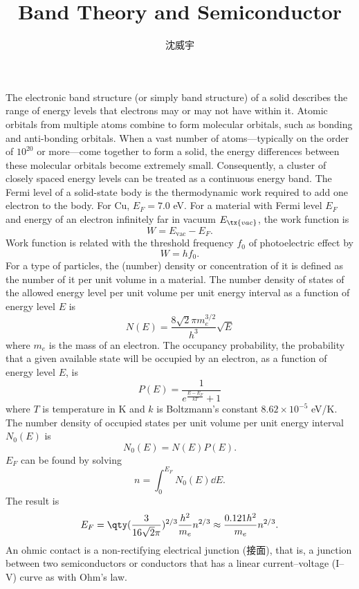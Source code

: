 \documentclass[a4paper,12pt]{article}
\begin{document}
\title{Band Theory and Semiconductor}
\author{沈威宇}
\date{\temtoday}
\titletocdoc
{}
The electronic band structure (or simply band structure) of a solid describes the range of energy levels that electrons may or may not have within it.
Atomic orbitals from multiple atoms combine to form molecular orbitals, such as bonding and anti-bonding orbitals. When a vast number of atoms—typically on the order of $10^{20}$ or more—come together to form a solid, the energy differences between these molecular orbitals become extremely small. Consequently, a cluster of closely spaced energy levels can be treated as a continuous energy band.
The Fermi level of a solid-state body is the thermodynamic work required to add one electron to the body. For Cu, $E_F=7.0$ eV.
For a material with Fermi level $E_F$ and energy of an electron infinitely far in vacuum $E_{\tx{vac}}$, the work function is
\[W=E_{\text{vac}}-E_F.\]
Work function is related with the threshold frequency $f_0$ of photoelectric effect by
\[W=hf_0.\]
For a type of particles, the (number) density or concentration of it is defined as the number of it per unit volume in a material.
The number density of states of the allowed energy level per unit volume per unit energy interval as a function of energy level $E$ is
\[N(E)=\frac{8\sqrt{2}\pi m_e^{3/2}}{h^3}\sqrt{E}\]
where $m_e$ is the mass of an electron.
The occupancy probability, the probability that a given available state will be occupied by an electron, as a function of energy level $E$, is
\[P(E)=\frac{1}{e^{\frac{E-E_F}{kT}}+1}\]
where $T$ is temperature in K and $k$ is Boltzmann's constant $8.62\times 10^{-5}$ eV/K.
The number density of occupied states per unit volume per unit energy interval $N_0(E)$ is
\[N_0(E)=N(E)P(E).\]
$E_F$ can be found by solving
\[n=\int_0^{E_F}N_0(E)\dd{E}.\]
The result is
\[E_F=\qty(\frac{3}{16\sqrt{2}\pi})^{2/3}\frac{h^2}{m_e}n^{2/3}\approx\frac{0.121h^2}{m_e}n^{2/3}.\]
An ohmic contact is a non-rectifying electrical junction (接面), that is, a junction between two semiconductors or conductors that has a linear current–voltage (I–V) curve as with Ohm's law.
\end{document}
